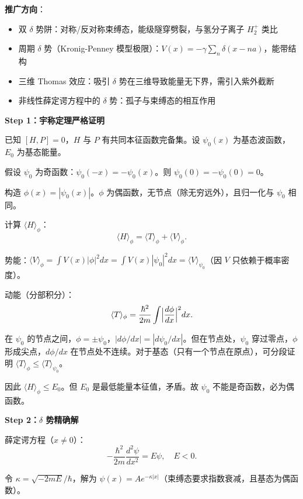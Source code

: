 \begin{insightbox}[物理图像与模型关联]
\textbf{推广方向}：
\begin{itemize}[nosep]
    \item 双 $\delta$ 势阱：对称/反对称束缚态，能级隧穿劈裂，与氢分子离子 $H_2^+$ 类比
    \item 周期 $\delta$ 势（Kronig-Penney 模型极限）：$V(x)=-\gamma\sum_n\delta(x-na)$，能带结构
    \item 三维 Thomas 效应：吸引 $\delta$ 势在三维导致能量无下界，需引入紫外截断
    \item 非线性薛定谔方程中的 $\delta$ 势：孤子与束缚态的相互作用
\end{itemize}
\end{insightbox}

\begin{derivationbox}
\textbf{Step 1：宇称定理严格证明}

已知 $[H,P]=0$，$H$ 与 $P$ 有共同本征函数完备集。设 $\psi_0(x)$ 为基态波函数，$E_0$ 为基态能量。

假设 $\psi_0$ 为奇函数：$\psi_0(-x)=-\psi_0(x)$。则 $\psi_0(0)=-\psi_0(0)=0$。

构造 $\phi(x)=|\psi_0(x)|$。$\phi$ 为偶函数，无节点（除无穷远外），且归一化与 $\psi_0$ 相同。

计算 $\langle H\rangle_\phi$：
\[
\langle H\rangle_\phi=\langle T\rangle_\phi+\langle V\rangle_\phi.
\]

势能：$\langle V\rangle_\phi=\int V(x)|\phi|^2dx=\int V(x)|\psi_0|^2dx=\langle V\rangle_{\psi_0}$（因 $V$ 只依赖于概率密度）。

动能（分部积分）：
\[
\langle T\rangle_\phi=\frac{\hbar^2}{2m}\int\Bigl|\frac{d\phi}{dx}\Bigr|^2dx.
\]

在 $\psi_0$ 的节点之间，$\phi=\pm\psi_0$，$|d\phi/dx|=|d\psi_0/dx|$。但在节点处，$\psi_0$ 穿过零点，$\phi$ 形成尖点，$d\phi/dx$ 在节点处不连续。对于基态（只有一个节点在原点），可分段证明 $\langle T\rangle_\phi\leq\langle T\rangle_{\psi_0}$。

因此 $\langle H\rangle_\phi\leq E_0$。但 $E_0$ 是最低能量本征值，矛盾。故 $\psi_0$ 不能是奇函数，必为偶函数。

\textbf{Step 2：$\delta$ 势精确解}

薛定谔方程（$x\neq0$）：
\[
-\frac{\hbar^2}{2m}\frac{d^2\psi}{dx^2}=E\psi,\quad E<0.
\]

令 $\kappa=\sqrt{-2mE}/\hbar$，解为 $\psi(x)=Ae^{-\kappa|x|}$（束缚态要求指数衰减，且基态为偶函数）。


\end{derivationbox}
